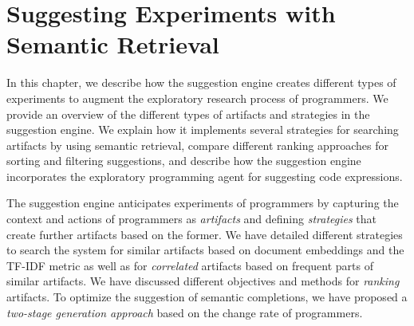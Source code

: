 
\chapter{Suggesting Experiments with Semantic Retrieval}
\label{cha:suggestions}

In this chapter, we describe how the suggestion engine creates different types of experiments to augment the exploratory research process of programmers.
We provide an overview of the different types of artifacts and strategies in the suggestion engine.
We explain how it implements several strategies for searching artifacts by using semantic retrieval, compare different ranking approaches for sorting and filtering suggestions, and describe how the suggestion engine incorporates the exploratory programming agent for suggesting code expressions.


\begin{summary}
	The suggestion engine anticipates experiments of programmers by capturing the context and actions of programmers as \emph{artifacts} and defining \emph{strategies} that create further artifacts based on the former.
	We have detailed different strategies to search the system for similar artifacts based on document embeddings and the TF-IDF metric as well as for \emph{correlated} artifacts based on frequent parts of similar artifacts.
	We have discussed different objectives and methods for \emph{ranking} artifacts.
	To optimize the suggestion of semantic completions, we have proposed a \emph{two-stage generation approach} based on the change rate of programmers.
\end{summary}
